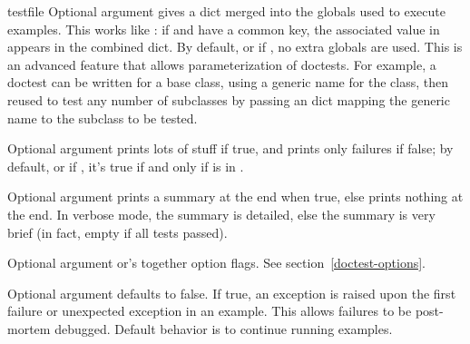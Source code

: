 \begin{funcdesc}{testfile}
  Optional argument  gives a dict merged into the
  globals used to execute examples.  This works like
  :  if  and  have a
  common key, the associated value in  appears in the
  combined dict.  By default, or if , no extra globals are
  used.  This is an advanced feature that allows parameterization of
  doctests.  For example, a doctest can be written for a base class, using
  a generic name for the class, then reused to test any number of
  subclasses by passing an  dict mapping the generic
  name to the subclass to be tested.

  Optional argument  prints lots of stuff if true, and prints
  only failures if false; by default, or if , it's true
  if and only if  is in .

  Optional argument  prints a summary at the end when true,
  else prints nothing at the end.  In verbose mode, the summary is
  detailed, else the summary is very brief (in fact, empty if all tests
  passed).

  Optional argument  or's together option flags.  See
  section~\ref{doctest-options}.

  Optional argument  defaults to false.  If true,
  an exception is raised upon the first failure or unexpected exception
  in an example.  This allows failures to be post-mortem debugged.
  Default behavior is to continue running examples.

\end{funcdesc}

